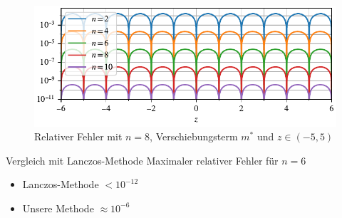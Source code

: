 \begin{frame}{}
\begin{figure}[h]
\centering
\includegraphics{../images/rel_error_range.pdf}
\caption{Relativer Fehler mit $n=8$, Verschiebungsterm $m^*$ und $z\in(-5, 5)$}
\end{figure}
\end{frame}

\begin{frame}{Vergleich mit Lanczos-Methode}
Maximaler relativer Fehler für $n=6$
\begin{itemize}
    \item Lanczos-Methode $< 10^{-12}$
    \item Unsere Methode $\approx 10^{-6}$ 
\end{itemize}
\end{frame}